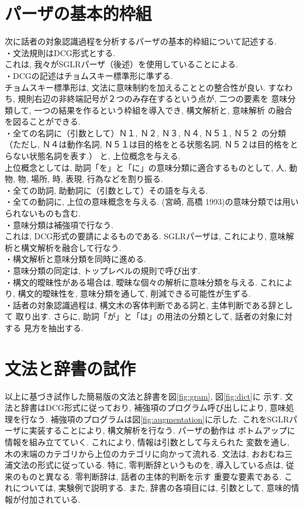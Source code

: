 \section{パーザの基本的枠組}
次に話者の対象認識過程を分析するパーザの基本的枠組について記述する. \\
・文法規則はDCG形式とする. \\
  これは, 我々がSGLRパーザ（後述）を使用していることによる. \\
・DCGの記述はチョムスキー標準形に準ずる. \\
  チョムスキー標準形は, 文法に意味制約を加えることとの整合性が良い. 
すなわち, 規則右辺の非終端記号が２つのみ存在するという点が, 二つの要素を
意味分類して, 一つの結果を作るという枠組を導入でき, 構文解析と, 意味解析
の融合を図ることができる. \\
・全ての名詞に（引数として）Ｎ１, Ｎ２, Ｎ３, Ｎ４, Ｎ５１, Ｎ５２ の分類
（ただし, Ｎ４は動作名詞, Ｎ５１は目的格をとる状態名詞, Ｎ５２は目的格をと
らない状態名詞を表す.）
と, 上位概念を与える. \\
上位概念としては, 助詞「を」と「に」の意味分類に適合するものとして, 人, 
動物, 物, 場所, 時, 表現, 行為などを割り振る. \\
・全ての助詞, 助動詞に（引数として）その語を与える. \\
・全ての動詞に, 上位の意味概念を与える. (宮崎, 高橋 1993)の意味分類では用い
られないものも含む. \\
・意味分類は補強項で行なう. \\これは, DCG形式の要請によるものである. 
SGLRパーザは, これにより, 意味解析と構文解析を融合して行なう. \\
・構文解析と意味分類を同時に進める. \\
・意味分類の同定は, トップレベルの規則で呼び出す. \\
・構文的曖昧性がある場合は, 曖昧な個々の解析に意味分類を与える. 
これにより, 構文的曖昧性を, 意味分類を通して, 削減できる可能性が生ずる. \\
・話者の対象認識過程は, 構文木の客体判断である詞と, 主体判断である辞として
取り出す. さらに, 助詞「が」と「は」の用法の分類として, 話者の対象に対する
見方を抽出する. 


\section{文法と辞書の試作}
以上に基づき試作した簡易版の文法と辞書を図\ref{fig:gram}, 図\ref{fig:dict}に
示す. 文法と辞書はDCG形式に従っており, 補強項のプログラム呼び出しにより, 
意味処理を行なう. 補強項のプログラムは図\ref{fig:augmentation}に示した. 
これをSGLRパーザに実装することにより, 構文解析を行なう. パーザの動作は
ボトムアップに情報を組み立てていく. これにより, 情報は引数として与えられた
変数を通し, 木の末端のカテゴリから上位のカテゴリに向かって流れる. 
文法は, おおむね三浦文法の形式に従っている. 特に, 零判断辞というものを, 
導入している点は, 従来のものと異なる. 零判断辞は, 話者の主体的判断を示す
重要な要素である. これについては, 実験例で説明する. また, 
辞書の各項目には, 引数として, 意味的情報が付加されている. 

